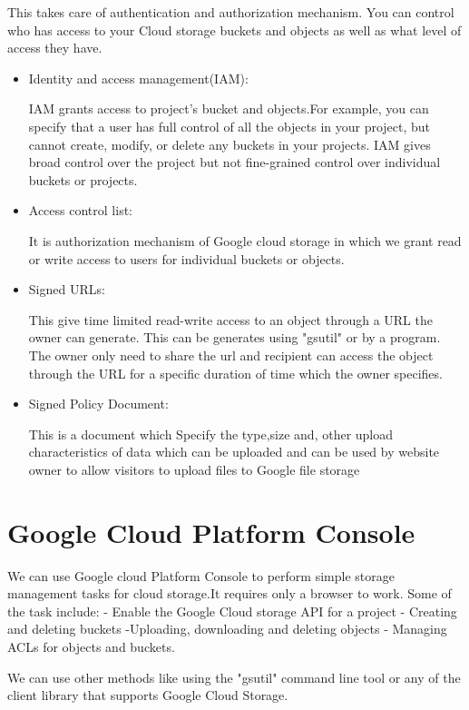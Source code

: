 \documentclass[9pt,twocolumn,twoside]{../../styles/osajnl}
\begin{document}
This takes care of authentication and authorization mechanism. You can control who has access to your Cloud storage buckets and objects as well as what level of access they have. 

\begin{itemize}


\item Identity and access management(IAM):

IAM grants access to project's bucket and objects.For example, you can specify that a user has full control of all the objects in your project, but cannot create, modify, or delete any buckets in your projects. IAM gives broad control over the project but not fine-grained control over individual buckets or projects.

\item Access control list:

 It is authorization mechanism of Google cloud storage in which we grant read or write access to users for individual buckets or objects.


\item Signed URLs:
 
This give time limited read-write access to an object through a URL the owner can generate. This can be generates using "gsutil" or by a program. The owner only need to share the url and recipient can access the object through the URL for a specific duration of time which the owner specifies.


\item Signed Policy Document:

This is a document which Specify the type,size and, other upload characteristics of data which can be uploaded and can be used by website owner to allow visitors to upload files to Google file storage

\end{itemize}

\section{Google Cloud Platform Console }

We can use Google cloud Platform Console to perform simple storage management tasks for cloud storage.It requires only a browser to work. Some of the task include:
- Enable the Google Cloud storage API for a project
- Creating and deleting buckets 
-Uploading, downloading and deleting objects
- Managing ACLs for objects and buckets.


We can use other methods like using the "gsutil" command line tool or any of the client library that supports Google Cloud Storage.
\end{document}
